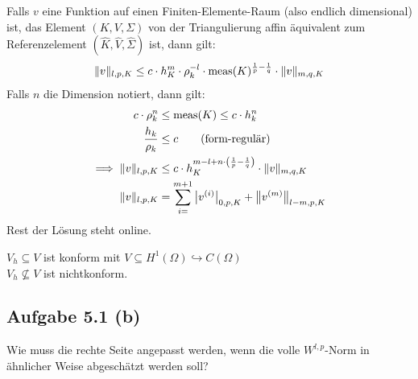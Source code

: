 \documentclass[12pt,a4paper]{article}
\begin{document}
\begin{bemerkung}
Falls $v$ eine Funktion auf einen Finiten-Elemente-Raum (also endlich dimensional) ist, das Element $(K,V,\Sigma)$ von der Triangulierung affin äquivalent zum Referenzelement $(\hat{K},\hat{V},\hat{\Sigma})$ ist, dann gilt:
\begin{align*}
\Vert v\Vert_{l,p,K}\leq c\cdot h_K^m\cdot\rho_k^{-l}\cdot\operatorname{meas}(K)^{\frac{1}{p}-\frac{1}{q}}\cdot\Vert v\Vert_{m,q,K}
\end{align*}
Falls $n$ die Dimension notiert, dann gilt:
\begin{align*}
c\cdot \rho_k^n&\leq\operatorname{meas}(K)\leq c\cdot h_k^n\\
\frac{h_k}{\rho_k}&\leq c\qquad\text{(form-regulär)}\\
\implies\Vert v\Vert_{l,p,K}&\leq c\cdot h_K^{m-l+n\cdot\left(\frac{1}{p}-\frac{1}{q}\right)}\cdot\Vert v\Vert_{m,q,K}\\
\Vert v\Vert_{l,p,K}&=\sum\limits_{i=}^{m+1}\big| v^{(i)}\big|_{0,p,K}+\big\Vert v^{(m)}\big\Vert_{l-m,p,K}
\end{align*}
Rest der Lösung steht online.
\end{bemerkung}

$V_h\subseteq V$ ist konform mit $V\subseteq H^1(\Omega)\hookrightarrow C(\Omega)$\\
$V_h\not\subseteq V$ ist nichtkonform.

\subsection*{Aufgabe 5.1 (b)}
Wie muss die rechte Seite angepasst werden, wenn die volle $W^{l,p}$-Norm in ähnlicher Weise abgeschätzt werden soll?

\begin{lösung}
\end{lösung}
\end{document}
